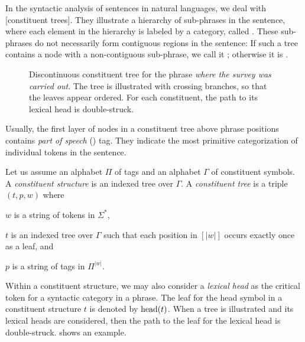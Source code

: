 \documentclass[../document.tex]{subfiles}
\begin{document}
    In the syntactic analysis of sentences in natural languages, we deal with [constituent trees].
    They illustrate a hierarchy of sub-phrases in the sentence, where each element in the hierarchy is labeled by a category, called .
    These sub-phrases do not necessarily form contiguous regions in the sentence:
    If such a tree contains a node with a non-contiguous sub-phrase, we call it ; otherwise it is .

    \begin{figure}
        \null\hfill
        
%        
        \hfill\null

        \caption{\label{fig:pre:ctree}
            Discontinuous constituent tree for the phrase \emph{where the survey was carried out}.
            The tree is illustrated with crossing branches, so that the leaves appear ordered.
            For each constituent, the path to its lexical head is double-struck.
        }
    \end{figure}

    Usually, the first layer of nodes in a constituent tree above phrase positions contains \emph{part of speech} () tag.
    They indicate the most primitive categorization of individual tokens in the sentence.

    Let us assume an alphabet \(\varPi\) of  tags and an alphabet \(\varGamma\) of constituent symbols.
    A \emph{constituent structure} is an indexed tree over \(\varGamma\).
    A \emph{constituent tree} is a triple \((t, p, w)\) where
    \begin{compactitem}
        \item \(w\) is a string of tokens in \(\varSigma^*\),
        \item \(t\) is an indexed tree over \(\varGamma\) such that each position in \([|w|]\) occurs exactly once as a leaf, and
        \item \(p\) is a string of  tags in \(\varPi^{|w|}\).
    \end{compactitem}

    Within a constituent structure, we may also consider a \emph{lexical head} as the critical token for a syntactic category in a phrase.
    The leaf for the head symbol in a constituent structure \(t\) is denoted by \(\operatorname{head}(t)\).
    When a tree is illustrated and its lexical heads are considered, then the path to the leaf for the lexical head is double-struck.
     shows an example.
\end{document}
